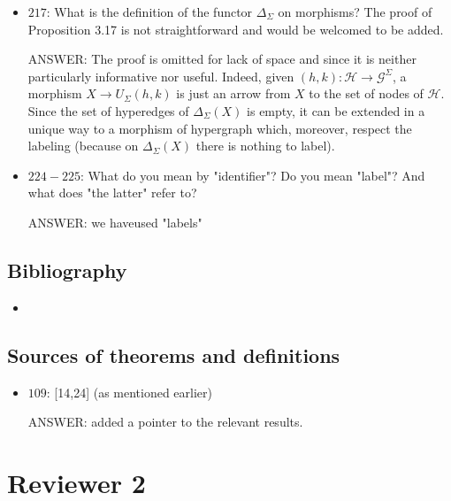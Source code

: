 \documentclass[english,11pt,a4paper]{article}
\begin{document}
\begin{itemize}
\item $217$: What is the definition of the functor $\Delta_\Sigma$ on morphisms? The proof of Proposition 3.17 is not straightforward and would be welcomed to be added.

ANSWER: The proof is omitted for lack of space and since it is neither particularly informative nor useful. Indeed, given $(h,k)\colon \mathcal{H}\to \mathcal{G}^\Sigma$,  a morphism $X\to U_{\Sigma}(h,k)$ is just an arrow from $X$ to the set of nodes of $\mathcal{H}$. Since the set of hyperedges of $\Delta_{\Sigma}(X)$ is empty, it can be extended in a unique way to a morphism of hypergraph which, moreover, respect the labeling (because on $\Delta_{\Sigma}(X)$ there is nothing to label).

\item $224-225$: What do you mean by "identifier"? Do you mean "label"? And what does "the latter" refer to? 

ANSWER: we haveused "labels"
\end{itemize}
\subsection*{Bibliography}
\begin{itemize}
	\item 
\end{itemize}

\subsection*{Sources of theorems and definitions}
\begin{itemize}
	\item $109$: [14,24] (as mentioned earlier)
	
	ANSWER: added a pointer to the relevant results.
\end{itemize}


\section*{Reviewer 2}



	
	
\end{document}
